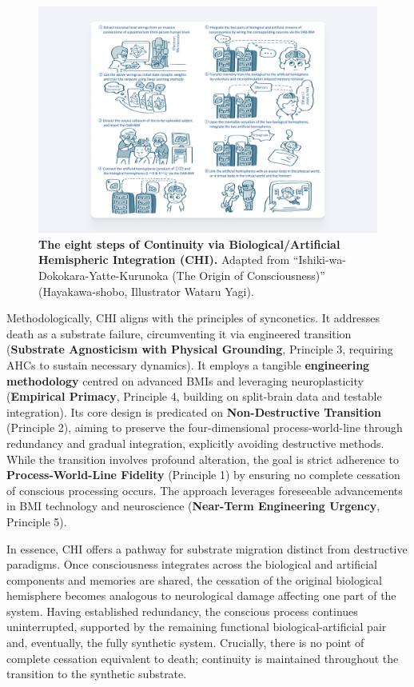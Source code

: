 \documentclass[10pt]{article}
\begin{document}
\begin{sloppypar}
  \begin{figure}[ht!]
    \centering
    \includegraphics[width=\textwidth]{figures/masa-approach-3.png}
    \caption[CHI: The eight steps of Continuity via Biological/Artificial Hemispheric Integration]{\textbf{The eight steps of Continuity via Biological/Artificial Hemispheric Integration (CHI).} Adapted from “Ishiki-wa-Dokokara-Yatte-Kurunoka (The Origin of Consciousness)” (Hayakawa-shobo, Illustrator Wataru Yagi).}
    \label{fig:masa-approach-3}
  \end{figure}

  Methodologically, CHI aligns with the principles of synconetics. It addresses death as a substrate failure, circumventing it via engineered transition (\textbf{Substrate Agnosticism with Physical Grounding}, Principle 3, requiring AHCs to sustain necessary dynamics). It employs a tangible \textbf{engineering methodology} centred on advanced BMIs and leveraging neuroplasticity (\textbf{Empirical Primacy}, Principle 4, building on split-brain data and testable integration). Its core design is predicated on \textbf{Non-Destructive Transition} (Principle 2), aiming to preserve the four-dimensional process-world-line through redundancy and gradual integration, explicitly avoiding destructive methods. While the transition involves profound alteration, the goal is strict adherence to \textbf{Process-World-Line Fidelity} (Principle 1) by ensuring no complete cessation of conscious processing occurs. The approach leverages foreseeable advancements in BMI technology and neuroscience (\textbf{Near-Term Engineering Urgency}, Principle 5).

  In essence, CHI offers a pathway for substrate migration distinct from destructive paradigms. Once consciousness integrates across the biological and artificial components and memories are shared, the cessation of the original biological hemisphere becomes analogous to neurological damage affecting one part of the system. Having established redundancy, the conscious process continues uninterrupted, supported by the remaining functional biological-artificial pair and, eventually, the fully synthetic system. Crucially, there is no point of complete cessation equivalent to death; continuity is maintained throughout the transition to the synthetic substrate.


\end{sloppypar}
\end{document}
